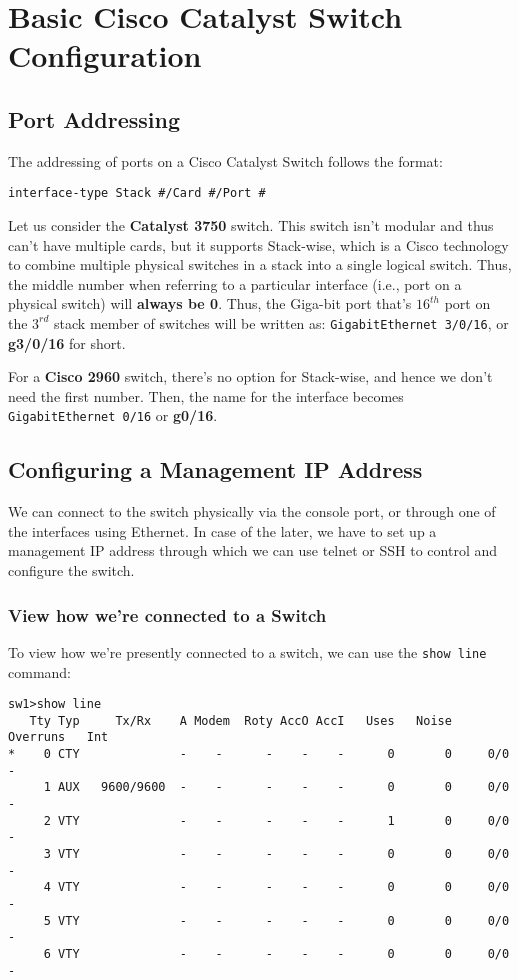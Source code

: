 \chapter{Basic Cisco Catalyst Switch Configuration}
\section{Port Addressing}
The addressing of ports on a Cisco Catalyst Switch follows the format:

\vspace{-5pt}
\begin{center}
	\verb|interface-type Stack #/Card #/Port #|
\end{center}
\vspace{-5pt}

\noindent
Let us consider the \textbf{Catalyst 3750} switch. This switch isn't modular and thus can't have multiple cards, but it supports Stack-wise, which is a Cisco technology to combine multiple physical switches in a stack into a single logical switch. Thus, the middle number when referring to a particular interface (i.e., port on a physical switch) will \textbf{always be 0}. Thus, the Giga-bit port that's $16^{th}$ port on the $3^{rd}$ stack member of switches will be written as: \verb|GigabitEthernet 3/0/16|, or \textbf{g3/0/16} for short. 

For a \textbf{Cisco 2960} switch, there's no option for Stack-wise, and hence we don't need the first number. Then, the name for the interface becomes \verb|GigabitEthernet 0/16| or \textbf{g0/16}.

\section{Configuring a Management IP Address}
We can connect to the switch physically via the console port, or through one of the interfaces using Ethernet. In case of the later, we have to set up a management IP address through which we can use telnet or SSH to control and configure the switch. 

\subsection{View how we're connected to a Switch}
To view how we're presently connected to a switch, we can use the \verb|show line| command: 

\vspace{-15pt}
\begin{verbatim}
sw1>show line
   Tty Typ     Tx/Rx    A Modem  Roty AccO AccI   Uses   Noise  Overruns   Int
*    0 CTY              -    -      -    -    -      0       0     0/0       -
	 1 AUX   9600/9600  -    -      -    -    -      0       0     0/0       -
	 2 VTY              -    -      -    -    -      1       0     0/0       -
	 3 VTY              -    -      -    -    -      0       0     0/0       -
	 4 VTY              -    -      -    -    -      0       0     0/0       -
	 5 VTY              -    -      -    -    -      0       0     0/0       -
	 6 VTY              -    -      -    -    -      0       0     0/0       -
\end{verbatim}
\vspace{-10pt}

